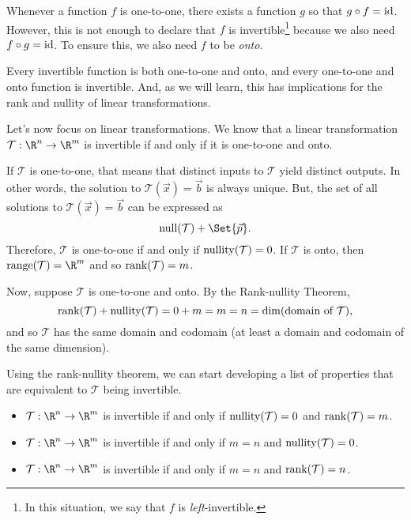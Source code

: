 
Whenever a function $f$ is one-to-one, there exists a function $g$ so that $g\circ f=\operatorname{\operatorname{id}}$.
However, this is not enough to declare that $f$ is invertible\footnote{ In this situation, we say that
$f$ is \emph{left}-invertible.} because we also need $f\circ g=\operatorname{\operatorname{id}}$. To ensure this, we also need
$f$ to be \emph{onto}.


Every invertible function is both one-to-one and onto, and every one-to-one and onto function
is invertible. And, as we will learn, this has implications for the rank and nullity of linear transformations.


Let's now focus on linear transformations. We know that a linear transformation $\mathcal T:\R^n\to\R^m$ is
invertible if and only if it is one-to-one and onto. 

If $\mathcal T$ is one-to-one, that means that distinct inputs to $\mathcal T$ yield distinct outputs. In other words,
the solution to $\mathcal T(\vec x)=\vec b$ is always unique. But, the set of all solutions to $\mathcal T(\vec x)=\vec b$
can be expressed as
\[
	\Null(\mathcal T)+\Set{\vec p}.
\]
Therefore, $\mathcal T$ is one-to-one if and only if $\operatorname{nullity}(\mathcal T)=0$.
If $\mathcal T$ is onto, then $\Range(\mathcal T)=\R^m$ and so $\operatorname{rank}(\mathcal T)=m$. 

Now, suppose $\mathcal T$ is one-to-one and onto. By the Rank-nullity Theorem,
\[
	\operatorname{rank}(\mathcal T)+\operatorname{nullity}(\mathcal T) = 0+m=m=n=\operatorname{dim}(\text{domain of $\mathcal T$}),
\]
and so $\mathcal T$ has the same domain and codomain (at least a domain and codomain of the same dimension).

Using the rank-nullity theorem, we can start developing a list of properties that are equivalent to $\mathcal T$
being invertible.
\begin{itemize}
	\item $\mathcal T:\R^n\to\R^m$ is invertible if and only if $\operatorname{nullity}(\mathcal T)=0$ and $\operatorname{rank}(\mathcal T)=m$.
	\item $\mathcal T:\R^n\to\R^m$ is invertible if and only if $m=n$ and $\operatorname{nullity}(\mathcal T)=0$.
	\item $\mathcal T:\R^n\to\R^m$ is invertible if and only if $m=n$ and $\operatorname{rank}(\mathcal T)=n$.
\end{itemize}


